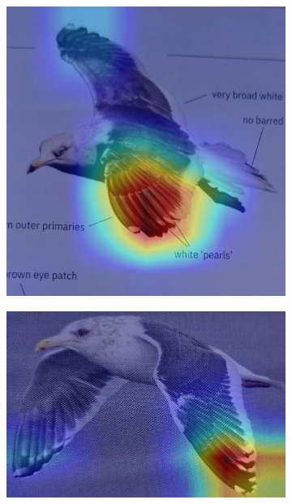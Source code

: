 \documentclass[a4paper,12pt]{report}
\begin{document}
\begin{figure}[htbp]
    \begin{subfigure}[b]{0.22\textwidth}
        \includegraphics[width=\textwidth]{images/interpretability/vgg/bird2.jpg}
        \caption{}
    \end{subfigure}
    \hfill
    \begin{subfigure}[b]{0.22\textwidth}
        \includegraphics[width=\textwidth]{images/interpretability/vgg/bird3.jpg}
        \caption{}
    \end{subfigure}
    \hfill
    \begin{subfigure}[b]{0.22\textwidth}

\end{subfigure}
\end{figure}
\end{document}
